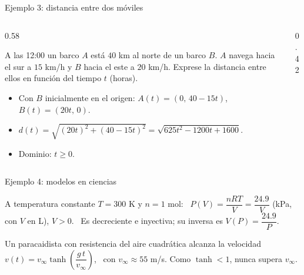 \documentclass[10pt,aspectratio=169]{beamer}
\begin{document}
\begin{frame}{Ejemplo 3: distancia entre dos móviles}
  \begin{columns}
    \begin{column}{0.58\textwidth}
      \begin{ejemplo}
        A las 12:00 un barco $A$ está $40$ km al norte de un barco $B$. $A$ navega hacia el sur a $15$ km/h y $B$ hacia el este a $20$ km/h.
        Exprese la distancia entre ellos en función del tiempo $t$ (horas).
        \begin{itemize}
          \item Con $B$ inicialmente en el origen: $A(t)=(0,\,40-15t)$, \ $B(t)=(20t,\,0)$.
          \item $d(t)=\sqrt{(20t)^2+(40-15t)^2}=\sqrt{625t^2-1200t+1600}$.
          \item Dominio: $t\ge0$.
        \end{itemize}
      \end{ejemplo}
    \end{column}
    \begin{column}{0.42\textwidth}
      \centering
    \end{column}
  \end{columns}
\end{frame}

\begin{frame}{Ejemplo 4: modelos en ciencias}
  \begin{ejemplo}
    A temperatura constante $T=300$ K y $n=1$ mol: \ $P(V)=\dfrac{nRT}{V}=\dfrac{24.9}{V}$ (kPa, con $V$ en L), $V>0$.
    \ Es decreciente e inyectiva; su inversa es $V(P)=\dfrac{24.9}{P}$.
  \end{ejemplo}
  \begin{ejemplo}
    Un paracaidista con resistencia del aire cuadrática alcanza la velocidad
    $v(t)=v_\infty\tanh\left(\dfrac{g\,t}{v_\infty}\right)$, \ con $v_\infty\approx55$ m/s.
    Como $\tanh<1$, nunca supera $v_\infty$.
  \end{ejemplo}
\end{frame}
\end{document}
